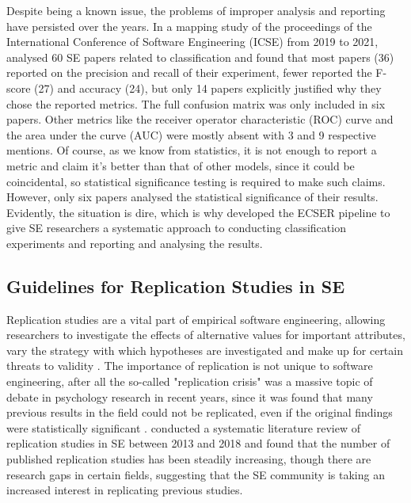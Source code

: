 \documentclass[a4paper]{article}
\begin{document}
Despite being a known issue, the problems of improper analysis and reporting have persisted over the years. In a mapping study of the proceedings of the International Conference of Software Engineering (ICSE) from 2019 to 2021, \textcite{Dellanna2022} analysed 60 SE papers related to classification and found that most papers (36) reported on the precision and recall of their experiment, fewer reported the F-score (27) and accuracy (24), but only 14 papers explicitly justified why they chose the reported metrics. The full confusion matrix was only included in six papers. Other metrics like the receiver operator characteristic (ROC) curve and the area under the curve (AUC) were mostly absent with 3 and 9 respective mentions. Of course, as we know from statistics, it is not enough to report a metric and claim it's better than that of other models, since it could be coincidental, so statistical significance testing is required to make such claims. However, only six papers analysed the statistical significance of their results. Evidently, the situation is dire, which is why \citeauthor{Dellanna2022} developed the ECSER pipeline to give SE researchers a systematic approach to conducting classification experiments and reporting and analysing the results. 

\subsection{Guidelines for Replication Studies in SE}
Replication studies are a vital part of empirical software engineering, allowing researchers to investigate the effects of alternative values for important attributes, vary the strategy with which hypotheses are investigated and make up for certain threats to validity \cite{Basili1999}. The importance of replication is not unique to software engineering, after all the so-called "replication crisis" was a massive topic of debate in psychology research in recent years, since it was found that many previous results in the field could not be replicated, even if the original findings were statistically significant \cite{Shrout2018,Maxwell2015,Amrhein2018}. \textcite{Cruz2020} conducted a systematic literature review of replication studies in SE between 2013 and 2018 and found that the number of published replication studies has been steadily increasing, though there are research gaps in certain fields, suggesting that the SE community is taking an increased interest in replicating previous studies.
\end{document}
